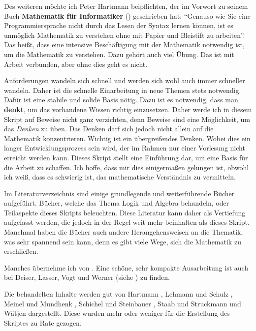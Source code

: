 Des weiteren möchte ich Peter Hartmann beipflichten, der im Vorwort zu 
seinem Buch \textbf{Mathematik für Informatiker} (\cite{Hartmann.2002}) 
geschrieben hat: \enquote{Genauso wie Sie eine Programmiersprache nicht durch 
das Lesen der Syntax lernen können, ist es unmöglich Mathematik zu verstehen 
ohne mit Papier und Bleistift zu arbeiten}. Das heißt, dass eine intensive
Beschäftigung mit der Mathematik notwendig ist, um die Mathematik zu 
verstehen. Dazu gehört auch viel Übung. Das ist mit Arbeit verbunden, aber 
ohne dies geht es nicht.

Anforderungen wandeln sich schnell und werden sich wohl auch immer schneller 
wandeln. Daher ist die schnelle Einarbeitung in neue Themen stets notwendig.
Dafür ist eine stabile und solide Basis nötig. Dazu ist es notwendig, dass 
man \textbf{denkt}, um das vorhandene Wissen richtig einzusetzen. Daher werde 
ich in diesem Skript auf Beweise nicht ganz verzichten, denn Beweise sind 
eine Möglichkeit, um das \emph{Denken} zu üben. Das Denken darf sich jedoch 
nicht allein auf die Mathematik konzentrieren. Wichtig ist ein übergreifendes 
Denken. Wobei dies ein langer Entwicklungsprozess sein wird, der im Rahmen nur
einer Vorlesung nicht erreicht werden kann. Dieses Skript stellt eine 
Einführung dar, um eine Basis für die Arbeit zu schaffen. Ich hoffe, dass mir 
dies einigermaßen gelungen ist, obwohl ich weiß, dass es schwierig ist, das 
mathematische Verständnis zu vermitteln.

Im Literaturverzeichnis sind einige grundlegende und weiterführende Bücher 
aufgeführt. Bücher, welche das Thema Logik und Algebra behandeln, oder 
Teilaspekte dieses Skripts beleuchten. Diese Literatur kann daher als 
Vertiefung aufgefasst werden, die jedoch in der Regel weit mehr beinhalten 
als dieses Skript. Manchmal haben die Bücher auch andere Herangehensweisen an 
die Thematik, was sehr spannend sein kann, denn es gibt viele Wege, sich die 
Mathematik zu erschließen.

Manches übernehme ich von \cite{Zeh-Marschke.2014}.
Eine schöne, sehr kompakte Ausarbeitung ist auch bei Deiser, Lasser, Vogt und 
Werner (siehe \cite{Deiser.Lasser.2016}) zu finden.

Die behandelten Inhalte werden gut von 
Hartmann \cite{Hartmann.2002}, 
Lehmann und Schulz \cite{Lehmann.2004}, 
Meinel und Mundhenk \cite{Meinel.2002}, 
Schichel und Steinbauer \cite{Schichl.2009}, 
Staab \cite{Staab.2007} und 
Struckmann und Wätjen \cite{Struckmann.2007} 
dargestellt. Diese wurden mehr oder weniger für die Erstellung des Skriptes 
zu Rate gezogen.

